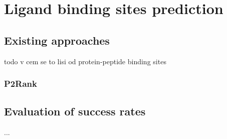 \chapter{Ligand binding sites prediction}

\section{Existing approaches}

todo v cem se to lisi od protein-peptide binding sites

\subsection{P2Rank}

\section{Evaluation of success rates}


...